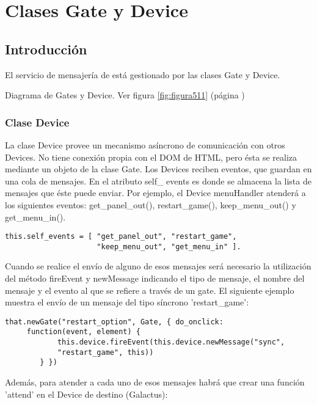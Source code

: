 \section{Clases Gate y Device}
\label{sec:gates_devices}

\subsection{Introducción}
\label{subsection:intro_gates}

El servicio de mensajería de \lluvia{} está gestionado por las clases Gate y Device.

Diagrama de Gates y Device. Ver figura \ref{fig:figura511} (página \pageref{fig:figura511})

\subsubsection{Clase Device}
\label{subsubsection:device}

La clase Device provee un mecanismo asíncrono de comunicación con otros Devices. No tiene conexión propia con el DOM de HTML, pero ésta se 
realiza mediante un objeto de la clase Gate. Los Devices reciben eventos, que guardan en una cola de mensajes. En el atributo self\_ events es 
donde se almacena la lista de mensajes que éste puede enviar. Por ejemplo, el Device menuHandler atenderá a los siguientes eventos: 
get\_panel\_out(), restart\_game(), keep\_menu\_out() y get\_menu\_in().\\

\begin{verbatim}
this.self_events = [ "get_panel_out", "restart_game", 
                     "keep_menu_out", "get_menu_in" ].
\end{verbatim}

Cuando se realice  el envío de alguno de esos mensajes será necesario la utilización del método fireEvent y newMessage indicando el tipo de
mensaje, el nombre del mensaje y el evento al que se refiere a través de un gate. El siguiente ejemplo muestra el envío de un mensaje del tipo 
síncrono 'restart\_game': 

\begin{verbatim}
that.newGate("restart_option", Gate, { do_onclick: 
     function(event, element) {
            this.device.fireEvent(this.device.newMessage("sync",
            "restart_game", this))
        } })
\end{verbatim}

Además, para atender a cada uno de esos mensajes habrá que crear una función 'attend' en el Device de destino (Galactus):\

